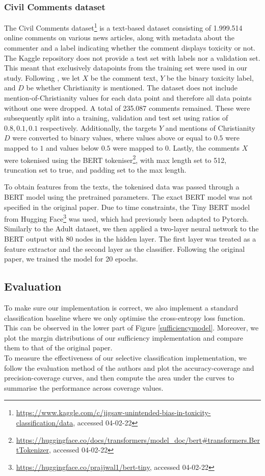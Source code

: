 \subsubsection{Civil Comments dataset}
The Civil Comments dataset\footnote{\url{https://www.kaggle.com/c/jigsaw-unintended-bias-in-toxicity-classification/data}, accessed 04-02-22} \citep{borkan2019nuanced} is a text-based dataset consisting of 1.999.514 online comments on various news articles, along with metadata about the commenter and a label indicating whether the comment displays toxicity or not. The Kaggle repository does not provide a test set with labels nor a validation set. This meant that exclusively datapoints from the training set were used in our study. Following \cite{lee2021fair}, we let $X$ be the comment text, $Y$ be the binary toxicity label, and $D$ be whether Christianity is mentioned. The dataset does not include mention-of-Christianity values for each data point and therefore all data points without one were dropped. A total of 235.087 comments remained. These were subsequently split into a training, validation and test set using ratios of $0.8, 0.1, 0.1$ respectively. Additionally, the targets $Y$ and mentions of Christianity $D$ were converted to binary values, where values above or equal to $0.5$ were mapped to $1$ and values below $0.5$ were mapped to $0$. Lastly, the comments $X$ were tokenised using the BERT tokeniser\footnote{\url{https://huggingface.co/docs/transformers/model_doc/bert#transformers.BertTokenizer}, accessed 04-02-22}, with max length set to 512, truncation set to true, and padding set to the max length.

To obtain features from the texts, the tokenised data was passed through a BERT model \citep{devlin2018bert} using the pretrained parameters. The exact BERT model was not specified in the original paper. Due to time constraints, the Tiny BERT model from Hugging Face\footnote{\url{https://huggingface.co/prajjwal1/bert-tiny}, accessed 04-02-22} \citep{DBLP:journals/corr/abs-1908-08962, bhargava2021generalization} was used, which had previously been adapted to Pytorch. Similarly to the Adult dataset, we then applied a two-layer neural network to the BERT output with 80 nodes in the hidden layer. The first layer was treated as a feature extractor and the second layer as the classifier. Following the original paper, we trained the model for 20 epochs.

\subsection{Evaluation}
To make sure our implementation is correct, we also implement a standard classification baseline where we only optimise the cross-entropy loss function. This can be observed in the lower part of Figure \ref{sufficiencymodel}. Moreover, we plot the margin distributions of our sufficiency implementation and compare them to that of the original paper. \\
To measure the effectiveness of our selective classification implementation, we follow the evaluation method of the authors and plot the accuracy-coverage and precision-coverage curves, and then compute the area under the curves to summarise the performance across coverage values.

